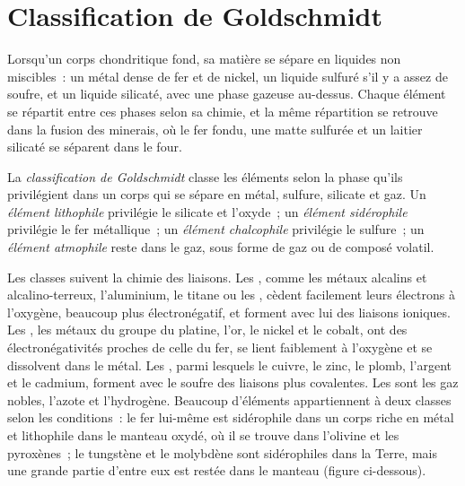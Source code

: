 \section{Classification de Goldschmidt}

Lorsqu'un corps chondritique fond, sa matière se sépare en liquides non
miscibles~: un métal dense de fer et de nickel, un liquide sulfuré s'il
y a assez de soufre, et un liquide silicaté, avec une phase gazeuse
au-dessus. Chaque élément se répartit entre ces phases selon sa chimie, et la
même répartition se retrouve dans la fusion des minerais, où le fer
fondu, une matte sulfurée et un laitier silicaté se séparent dans le four.

\begin{definition}
\label{def:b2:elements-in-the-earth:goldschmidt}
La \emph{classification de Goldschmidt}
classe les éléments selon la phase qu'ils privilégient dans un
corps qui se sépare en métal, sulfure, silicate et gaz. Un
\emph{élément lithophile} privilégie le silicate et l'oxyde~;
un \emph{élément sidérophile} privilégie
le fer métallique~; un \emph{élément chalcophile}
privilégie le sulfure~; un \emph{élément atmophile}
reste dans le gaz, sous forme de gaz ou de composé volatil.
\end{definition}

Les classes suivent la chimie des liaisons. Les , comme les métaux
alcalins et alcalino-terreux, l'aluminium, le titane ou les , cèdent facilement
leurs électrons à l'oxygène, beaucoup plus électronégatif, et forment avec lui des liaisons
ioniques. Les , les métaux du groupe du platine, l'or, le nickel
et le cobalt, ont des électronégativités proches de celle du fer, se lient faiblement à
l'oxygène et se dissolvent dans le métal. Les , parmi lesquels le
cuivre, le zinc, le plomb, l'argent et le cadmium, forment avec le soufre des liaisons plus
covalentes. Les  sont les gaz nobles, l'azote et l'hydrogène. Beaucoup
d'éléments appartiennent à deux classes selon les conditions~: le fer lui-même est
sidérophile dans un corps riche en métal et lithophile dans le manteau oxydé, où il se trouve
dans l'olivine et les pyroxènes~; le tungstène et le molybdène sont sidérophiles dans la
Terre, mais une grande partie d'entre eux est restée dans le manteau (figure ci-dessous).

